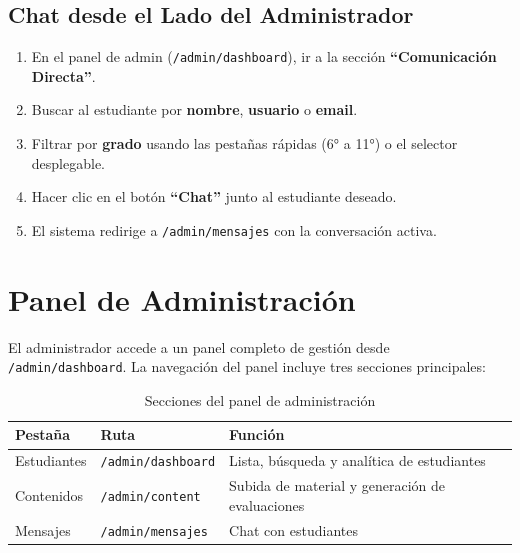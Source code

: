\documentclass[12pt, a4paper, oneside]{book}
\begin{document}
\section{Chat desde el Lado del Administrador}

\begin{stepbox}[title={Iniciar un chat con un estudiante}]
\begin{enumerate}
    \item En el panel de admin (\texttt{/admin/dashboard}), ir a la sección \textbf{``Comunicación Directa''}.
    \item Buscar al estudiante por \textbf{nombre}, \textbf{usuario} o \textbf{email}.
    \item Filtrar por \textbf{grado} usando las pestañas rápidas (6° a 11°) o el selector desplegable.
    \item Hacer clic en el botón \textbf{``Chat''} junto al estudiante deseado.
    \item El sistema redirige a \texttt{/admin/mensajes} con la conversación activa.
\end{enumerate}
\end{stepbox}


\chapter{Panel de Administración}

El administrador accede a un panel completo de gestión desde \texttt{/admin/dashboard}. La navegación del panel incluye tres secciones principales:

\begin{table}[H]
\centering
\renewcommand{\arraystretch}{1.3}
\begin{tabularx}{\textwidth}{l l X}
    \toprule
    \textbf{Pestaña} & \textbf{Ruta} & \textbf{Función} \\
    \midrule
    Estudiantes & \texttt{/admin/dashboard} & Lista, búsqueda y analítica de estudiantes \\
    Contenidos & \texttt{/admin/content} & Subida de material y generación de evaluaciones \\
    Mensajes & \texttt{/admin/mensajes} & Chat con estudiantes \\
    \bottomrule
\end{tabularx}
\caption{Secciones del panel de administración}
\end{table}
\end{document}
